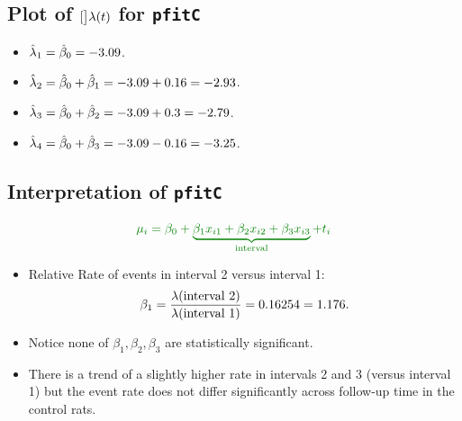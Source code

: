 \documentclass{article}\usepackage[]{graphicx}\usepackage[svgnames]{xcolor}
\let\exp\relax%
\let\log\relax%
\begin{document}
\subsection*{Plot of $\log[\big]{\lambda(t)}$ for \texttt{pfitC}}
\begin{center}
\end{center}
\begin{itemize}
    \item $ \log{\hat{\lambda}_1}=\hat{\beta}_0=-3.09 $.
    \item $ \log{\hat{\lambda}_2}=\hat{\beta}_0+\hat{\beta}_1=-3.09+0.16=-2.93 $.
    \item $ \log{\hat{\lambda}_3}=\hat{\beta}_0+\hat{\beta}_2=-3.09+0.3=-2.79 $.
    \item $ \log{\hat{\lambda}_4}=\hat{\beta}_0+\hat{\beta}_3=-3.09-0.16=-3.25 $.
\end{itemize}
\subsection*{Interpretation of \texttt{pfitC}}
\[ \textcolor{Green}{\log{\mu_i}=\beta_0+\underbrace{\beta_1x_{i1}+\beta_2x_{i2}+\beta_3x_{i3}}_{\text{interval}}+\log{t_i}} \]
\begin{itemize}
    \item Relative Rate of events in interval 2 versus interval 1:
          \[ \exp{\beta_1}=\frac{\lambda(\text{interval 2})}{\lambda(\text{interval 1})}=\exp{0.16254}=1.176. \]
    \item Notice none of $ \beta_1,\beta_2,\beta_3 $ are statistically significant.
    \item There is a trend of a slightly higher rate in intervals 2 and 3 (versus interval 1) but
          the event rate does not differ significantly across follow-up time in the control rats.
\end{itemize}
\end{document}
